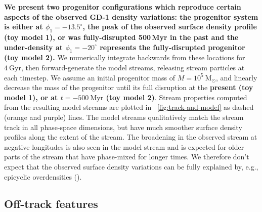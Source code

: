 \documentclass[modern]{aastex62}
\newcommand{\msun}{\textrm{M}_\odot}
\newcommand{\changes}[1]{{\textbf{#1}}}
\begin{document}
\changes{We present two progenitor configurations which reproduce certain aspects of the observed GD-1 density variations: the progenitor system is either at $\phi_1 = -13.5^\circ$, the peak of the observed surface density profile (toy model 1), or was fully-disrupted 500\,Myr in the past and the under-density at $\phi_1 = -20^\circ$ represents the fully-disrupted progenitor (toy model 2).}
We numerically integrate backwards from these locations for $4~\textrm{Gyr}$,
then forward-generate the model streams, releasing stream particles at each
timestep.
We assume an initial progenitor mass of $M=10^5~\msun$, and linearly decrease
the mass of the progenitor until its full disruption at the \changes{present (toy model 1), or at $t = -500~\textrm{Myr}$ (toy model 2)}.
Stream properties computed from the resulting model streams are plotted in
\figurename~\ref{fig:track-and-model} as dashed (orange and purple) lines.
The model streams qualitatively match the stream track in all phase-space
dimensions, but have much smoother surface density profiles along the extent of
the stream.
The broadening in the observed stream at negative longitudes is also seen in the model stream and is expected for older parts of the stream that have phase-mixed for longer times.
We therefore don't expect that the observed surface density variations can be fully explained by, e.g., epicyclic overdensities (\citealt{Kupper:2012}).


\subsection{Off-track features}
\label{sec:res_gap}
\end{document}
